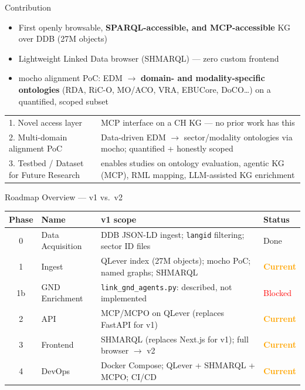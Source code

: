 \documentclass[xcolor,aspectratio=169,compress]{beamer}
\newcommand{\done}{\textcolor{green!60!black}{Done}}
\newcommand{\current}{\textcolor{orange}{\textbf{Current}}}
\newcommand{\blocked}{\textcolor{red}{Blocked}}
\begin{document}
\begin{frame}{Contribution}
  \small
  \begin{itemize}\setlength{\itemsep}{4pt}
    \item First openly browsable, \textbf{SPARQL-accessible, and MCP-accessible} KG over DDB (27M objects)
    \item Lightweight Linked Data browser (SHMARQL) --- zero custom frontend
    \item mocho alignment PoC: EDM $\to$ \textbf{domain- and modality-specific ontologies}
          (RDA, RiC-O, MO/ACO, VRA, EBUCore, DoCO\ldots) on a quantified, scoped subset
  \end{itemize}
  \smallskip
  \footnotesize
  \begin{tabular}{lp{9cm}}
    \toprule
    1. Novel access layer & MCP interface on a CH KG --- no prior work has this \\
    2. Multi-domain alignment PoC & Data-driven EDM $\to$ sector/modality ontologies via mocho; quantified + honestly scoped \\
    3. Testbed / Dataset for Future Research & enables studies on ontology evaluation, agentic KG (MCP), RML mapping, LLM-assisted KG enrichment \\
    \bottomrule
  \end{tabular}
\end{frame}

\begin{frame}{Roadmap Overview --- v1 vs.\ v2}
  \footnotesize
  \begin{tabular}{cl>{\raggedright\arraybackslash}p{6.5cm}l}
    \toprule
    Phase & Name & v1 scope & Status \\
    \midrule
    0  & Data Acquisition   & DDB JSON-LD ingest; \texttt{langid} filtering; sector ID files & \done \\
    1  & Ingest             & QLever index (27M objects); mocho PoC; named graphs; SHMARQL  & \current \\
    1b & GND Enrichment     & \texttt{link\_gnd\_agents.py}: described, not implemented      & \blocked \\
    2  & API                & MCP/MCPO on QLever (replaces FastAPI for v1)                   & \current \\
    3  & Frontend           & SHMARQL (replaces Next.js for v1); full browser $\to$ v2       & \current \\
    4  & DevOps             & Docker Compose; QLever + SHMARQL + MCPO; CI/CD                 & \current \\
    \bottomrule
  \end{tabular}
\end{frame}
\end{document}
